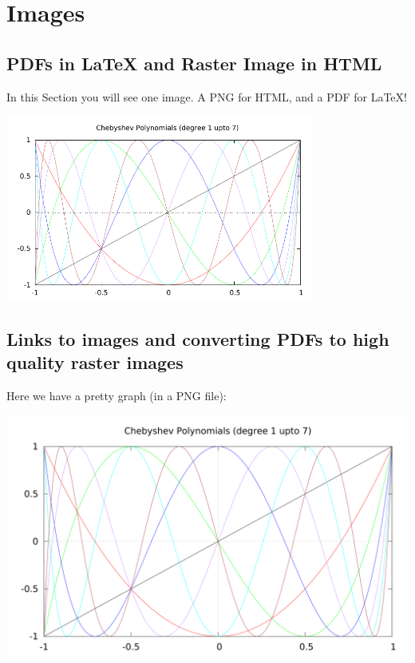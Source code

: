 \documentclass[11pt]{article}
\begin{document}
\section{Images}
\label{sec:orgd0adabf}

\subsection{PDFs in \LaTeX{} and Raster Image in HTML}
\label{sec:orgaaa27bd}

In this Section you will see one image.  A PNG for HTML, and a PDF for \LaTeX{}!

\includegraphics[width=4in]{example.pdf}

\subsection{Links to images and converting PDFs to high quality raster images}
\label{sec:org67708ac}

Here we have a pretty graph (in a PNG file):

\begin{center}
\includegraphics[width=.9\linewidth]{example.png}
\end{center}
\end{document}
